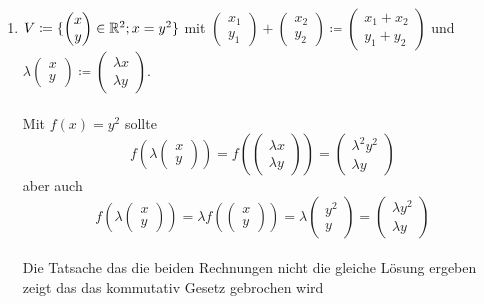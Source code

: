 \documentclass{HM}
\begin{document}
\begin{enumerate}
\begin{enumerate}
\item $V\coloneqq\lbrace\begin{pmatrix}
x\\
y
\end{pmatrix}\in\mathbb{R}^2; x=y^2 \rbrace$ mit $\begin{pmatrix}
x_1\\
y_1
\end{pmatrix}+\begin{pmatrix}
x_2\\
y_2
\end{pmatrix}\coloneqq\begin{pmatrix}
x_1+x_2\\
y_1+y_2
\end{pmatrix}$ und $\lambda\begin{pmatrix}
x\\
y
\end{pmatrix}\coloneqq\begin{pmatrix}
\lambda x\\
\lambda y
\end{pmatrix}$.\\\\
Mit $f(x)=y^2$ sollte
$$f\left(\lambda\begin{pmatrix}x\\y\end{pmatrix}\right)=
f\left(\begin{pmatrix}\lambda x\\\lambda y\end{pmatrix}\right)=
\begin{pmatrix}
	\lambda^2y^2\\\lambda y
\end{pmatrix}$$
aber auch
$$
f\left(\lambda\begin{pmatrix}x\\y\end{pmatrix}\right)=
\lambda f\left(\begin{pmatrix}x\\y\end{pmatrix}\right)=
\lambda\begin{pmatrix}y^2\\y\end{pmatrix}=
\begin{pmatrix}\lambda y^2\\\lambda y\end{pmatrix}$$\\
Die Tatsache das die beiden Rechnungen nicht die gleiche Lösung ergeben zeigt das das kommutativ Gesetz gebrochen wird

\end{enumerate}
\end{enumerate}
\end{document}
